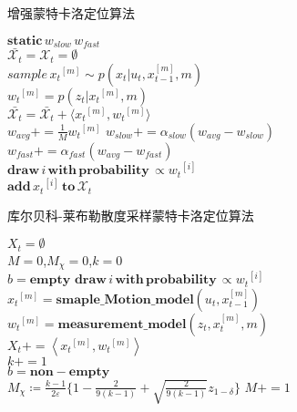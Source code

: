 \documentclass[lang=cn,11pt,a4paper]{elegantpaper}
\begin{document}
\begin{algorithm}
  \caption{增强蒙特卡洛定位算法}
  \label{Augmented_MCL}
  $\mathbf{static}\, w_{slow}\, w_{fast}$\\
  $\bar{\mathcal X_t} = \mathcal X_t = \emptyset$ \\
  {
      $sample\,{ x_t}^{[m]} \sim p( x_t|u_t,{ x_{t-1}^{[m]}}, m)$ \\
      ${ w_t}^{[m]}=p( z_t|{ x_t}^{[m]}, m)$ \\
      $\bar{\mathcal X_t} = \bar{\mathcal X_t} + \langle { x_t}^{[m]},{ w_t}^{[m]} \rangle$\\
      $w_{avg} += \frac{1}{M} { w_t}^{[m]}$
  }
  $w_{slow}+=\alpha_{slow}(w_{avg}-w_{slow})$ \\
  $w_{fast}+=\alpha_{fast}(w_{avg}-w_{fast})$ \\
  {
      $\mathbf{draw}\, i\, \mathbf{with}\,\mathbf{probability}\,\propto  {w_t}^{[i]}$ \\
      $\mathbf{add}\,{ x_t}^{[i]}\,\mathbf{to}\,\mathcal X_{t}$
  }
\end{algorithm}

\begin{algorithm}
  \caption{库尔贝科-莱布勒散度采样蒙特卡洛定位算法}
  \label{KLD_MCL}
  $X_t = \emptyset$ \\
  $M=0$,$M_{\chi }=0$,$k=0$\\
  {
    $b = \mathbf{empty}$
  }
  {
    $\mathbf{draw}\, i\, \mathbf{with}\,\mathbf{probability}\,\propto  {w_t}^{[i]}$ \\
    ${x_t}^{[m]} = \mathbf{smaple\_Motion\_model}(u_t,x_{t-1}^{[m]})$ \\
    ${w_t}^{[m]} = \mathbf{measurement\_model}(z_t,x_{t}^{[m]},m)$ \\
    $X_t += \left\langle {x_t}^{[m]},{w_t}^{[m]}\right\rangle $ \\
    {
      $k+=1$\\
      $b = \mathbf{non-empty}$\\
      {
        $M_{\chi} \coloneqq \frac{k-1}{2\varepsilon } \{ 1- \frac{2}{9(k-1)} + \sqrt{\frac{2}{9(k-1)}} z_{1-\delta }\} $
      }
    }
    $M += 1$
  }
\end{algorithm}
\end{document}
